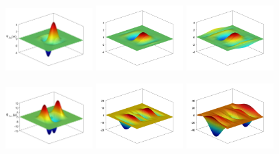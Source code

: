 \begin{figure}[H]
\begin{subcaptiongroup}
\end{subcaptiongroup}
\begin{subcaptiongroup}
\includegraphics[width=0.3\textwidth]{figure/nomesh/QD41/3.png}
\includegraphics[width=0.3\textwidth]{figure/nomesh/C41/3.png}
\includegraphics[width=0.3\textwidth]{figure/nomesh/QT41/3.png}
\end{subcaptiongroup}
\begin{subcaptiongroup}
    \includegraphics[width=0.3\textwidth]{figure/nomesh/QD41/4.png}
    \includegraphics[width=0.3\textwidth]{figure/nomesh/C41/4.png}
    \includegraphics[width=0.3\textwidth]{figure/nomesh/QT41/4.png}

\end{subcaptiongroup}
\end{figure}
